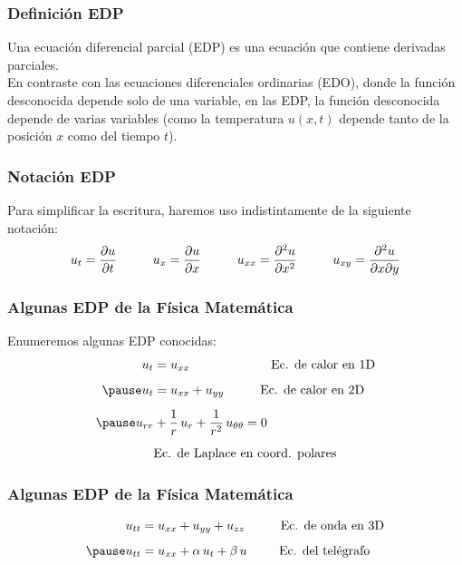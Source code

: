 \documentclass[12pt]{beamer}
\begin{document}
\begin{frame}
\frametitle{Definición EDP}
Una ecuación diferencial parcial (EDP) es una ecuación que contiene derivadas parciales. 
\\
\bigskip
\pause
En contraste con las ecuaciones diferenciales ordinarias (EDO), donde la función desconocida depende solo de una variable, en las EDP, la función desconocida depende de varias variables (como la temperatura $u (x, t)$ depende tanto de la posición $x$ como del tiempo $t$).
\end{frame}
\begin{frame}
\frametitle{Notación EDP}
Para simplificar la escritura, haremos uso indistintamente de la siguiente notación:
\pause
\begin{align*}
u_{t} = \pdv{u}{t} \hspace{1cm} u_{x} = \pdv{u}{x} \hspace{1cm} u_{xx} = \pdv[2]{u}{x} \hspace{1cm} u_{xy} = \pdv[2]{u}{x}{y}
\end{align*}
\end{frame}
\begin{frame}
\frametitle{Algunas EDP de la Física Matemática}
Enumeremos algunas EDP conocidas:
\pause
\begin{eqnarray*}
\begin{aligned}
u_{t} &= u_{xx} \hspace{2.25cm} \mbox{Ec. de calor en 1D} \\[0.5em] \pause
u_{t} &= u_{xx} + u_{yy} \hspace{1cm} \mbox{Ec. de calor en 2D} \\[0.5em] \pause
u_{rr} &+ \dfrac{1}{r} \, u_{r} + \dfrac{1}{r^{2}} \, u_{\theta \theta} = 0 \\[0.5em]
&{} \mbox{Ec. de Laplace en coord. polares}
\end{aligned}
\end{eqnarray*}
\end{frame}
\begin{frame}
\frametitle{Algunas EDP de la Física Matemática}
\begin{eqnarray*}
\begin{aligned}
u_{tt} &= u_{xx} + u_{yy} + u_{zz} \hspace{1cm} \mbox{Ec. de onda en 3D} \\[0.5em] \pause
u_{tt} &= u_{xx} + \alpha \, u_{t} + \beta \, u \hspace{0.9cm} \mbox{Ec. del telégrafo}
\end{aligned}
\end{eqnarray*}
\end{frame}
\end{document}
